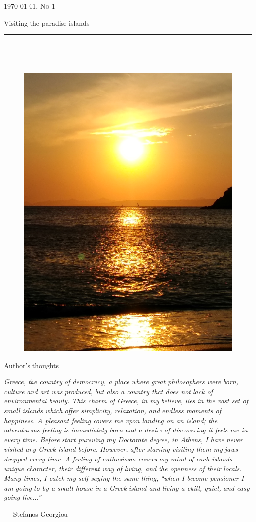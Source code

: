 \documentclass[10pt,a4paper]{article} %
\newcommand{\HorRule}[1]{\noindent\rule{\linewidth}{#1}} %
\newcommand{\SepRule}{\noindent	%
\begin{center}
\rule{250pt}{1pt} %
\end{center}
}
\newcommand{\NewsletterName}[1]{ %
\begin{center}
\Huge \usefont{T1}{fvs}{b}{n} %
#1
\end{center}	
\par \normalsize \normalfont}
\newcommand{\JournalIssue}[1]{ %
\hfill \textsc{\mydate \today, No #1} %
\par \normalsize \normalfont}
\newcommand{\NewsItem}[1]{ %
\usefont{T1}{fvs}{n}{n} %
\vspace{24pt}\large #1\vspace{3pt} %
\par \normalsize \normalfont}
\begin{document}
\JournalIssue{1} %

\NewsletterName{Visiting the paradise islands} %

\noindent\HorRule{3pt} \\[-0.75\baselineskip] %
\HorRule{1pt} %


\vspace{0.5cm}
\SepRule
\vspace{-0.5cm}

\begin{center}
\begin{minipage}[h]{0.84\linewidth}
\begin{figure}
\includegraphics[width=0.4 \textwidth]{media/front_picture.jpg}
\\
\end{figure}
	
\NewsItem{Author's thoughts} %
\vspace{3pt} %
\textit{
Greece, the country of democracy, a place where great philosophers were born, 
culture and art was produced, but also a country that does not lack of 
environmental beauty. 
This charm of Greece, in my believe, lies in the vast set of small islands which offer 
simplicity, relaxation, and endless moments of happiness. 
A pleasant feeling covers me upon landing on an island; the adventurous feeling 
is immediately born and a desire of discovering it feels me in every time. 
Before start pursuing my Doctorate degree, in Athens, I have never visited any 
Greek island before. 
However, after starting visiting them my jaws dropped every time. 
A feeling of enthusiasm covers my mind of each islands unique character, 
their different way of living, and the openness of their locals.
Many times, I catch my self saying the same thing, ``when I become pensioner I am 
going to by a small house in a Greek island and living a chill, quiet, and easy 
going live...''
}
\par\hfill --- Stefanos Georgiou
\end{minipage}
\end{center}
\end{document}
